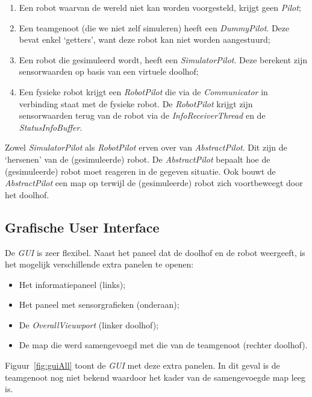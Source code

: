 \documentclass[eind]{penoverslag}
\begin{document}
\begin{enumerate}
	\item Een robot waarvan de wereld niet kan worden voorgesteld, krijgt geen \textit{Pilot};
	\item Een teamgenoot (die we niet zelf simuleren) heeft een \textit{DummyPilot}. Deze bevat enkel `getters', want deze robot kan niet worden aangestuurd;
	\item Een robot die gesimuleerd wordt, heeft een \textit{SimulatorPilot}. Deze berekent zijn sensorwaarden op basis van een virtuele doolhof;
	\item Een fysieke robot krijgt een \textit{RobotPilot} die via de \textit{Communicator} in verbinding staat met de fysieke robot. De \textit{RobotPilot} krijgt zijn sensorwaarden terug van de robot via de \textit{InfoReceiverThread} en de \textit{StatusInfoBuffer}.
\end{enumerate}

Zowel \textit{SimulatorPilot} als \textit{RobotPilot} erven over van \textit{AbstractPilot}. Dit zijn de `hersenen' van de (gesimuleerde) robot. De \textit{AbstractPilot} bepaalt hoe de (gesimuleerde) robot moet reageren in de gegeven situatie. Ook bouwt de \textit{AbstractPilot} een map op terwijl de (gesimuleerde) robot zich voortbeweegt door het doolhof.

\subsection{Grafische User Interface}
\label{ssec:GUI}

De \textit{GUI} is zeer flexibel. Naast het paneel dat de doolhof en de robot weergeeft, is het mogelijk verschillende extra panelen te openen:


\begin{itemize}
	\item Het informatiepaneel (links);
	\item Het paneel met sensorgrafieken (onderaan);
	\item De \textit{OverallVieuwport} (linker doolhof);
	\item De map die werd samengevoegd met die van de teamgenoot (rechter doolhof).
\end{itemize}

Figuur~\ref{fig:guiAll} toont de \textit{GUI} met deze extra panelen. In dit geval is de teamgenoot nog niet bekend waardoor het kader van de samengevoegde map leeg is.\\
\end{document}
